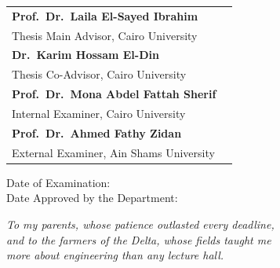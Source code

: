 \documentclass[12pt,a4paper,oneside]{report}
\begin{document}
\vspace{0.35in}

\begin{tabular}{@{}p{9.2cm}p{3.3cm}@{}}
\textbf{Prof.\ Dr.\ Laila El-Sayed Ibrahim}\\
Thesis Main Advisor, Cairo University & \dotfill \\[16pt]
\textbf{Dr.\ Karim Hossam El-Din}\\
Thesis Co-Advisor, Cairo University & \dotfill \\[16pt]
\textbf{Prof.\ Dr.\ Mona Abdel Fattah Sherif}\\
Internal Examiner, Cairo University & \dotfill \\[16pt]
\textbf{Prof.\ Dr.\ Ahmed Fathy Zidan}\\
External Examiner, Ain Shams University & \dotfill
\end{tabular}

\vspace{0.4in}
Date of Examination: \dotfill\\
Date Approved by the Department: \dotfill

\newpage
\thispagestyle{plain}
\vspace*{2in}
\begin{center}
\itshape\large
To my parents, whose patience outlasted every deadline,\\
and to the farmers of the Delta, whose fields taught me\\
more about engineering than any lecture hall.
\end{center}

\newpage
\thispagestyle{plain}

































\end{document}
